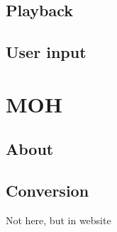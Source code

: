 \subsection{Playback}
\subsection{User input}



\section{MOH}
\subsection{About}
\subsection{Conversion}
Not here, but in website 